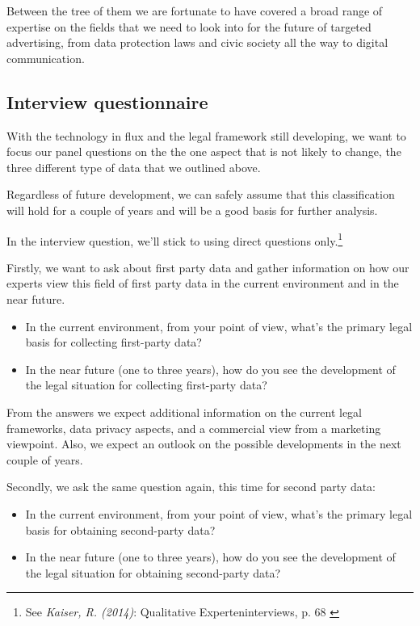 Between the tree of them we are fortunate to have covered a broad range of expertise on the fields that we need to look into for the future of targeted advertising, from data protection laws and civic society all the way to digital communication.

\subsection{Interview questionnaire}

With the technology in flux and the legal framework still developing, we want to focus our panel questions on the the one aspect that is not likely to change, the three different type of data that we outlined above.

Regardless of future development, we can safely assume that this classification will hold for a couple of years and will be a good basis for further analysis.

In the interview question, we'll stick to using direct questions only.\footnote{See \textit{Kaiser, R. (2014)}: Qualitative Experteninterviews, p. 68 \cite{expertInterviews}}

Firstly, we want to ask about first party data and gather information on how our experts view this field of first party data in the current environment and in the near future. 

\begin{itemize}
 \item In the current environment, from your point of view, what's the primary legal basis for collecting first-party data?
 \item In the near future (one to three years), how do you see the development of the legal situation for collecting first-party data?
\end{itemize}
 
From the answers we expect additional information on the current legal frameworks, data privacy aspects, and a commercial view from a marketing viewpoint. Also, we expect an outlook on the possible developments in the next couple of years.
 
Secondly, we ask the same question again, this time for second party data:

\begin{itemize} 
 \item In the current environment, from your point of view, what's the primary legal basis for obtaining second-party data?
 \item In the near future (one to three years), how do you see the development of the legal situation for obtaining second-party data?
\end{itemize}

